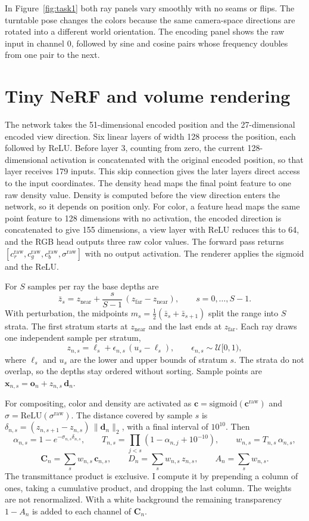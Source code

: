 \documentclass[11pt]{article}
\begin{document}
In Figure~\ref{fig:task1} both ray panels vary smoothly with no seams or flips. The turntable pose changes the colors because the same camera-space directions are rotated into a different world orientation. The encoding panel shows the raw input in channel 0, followed by sine and cosine pairs whose frequency doubles from one pair to the next.

\section{Tiny NeRF and volume rendering}

The network takes the 51-dimensional encoded position and the 27-dimensional encoded view direction. Six linear layers of width 128 process the position, each followed by ReLU. Before layer 3, counting from zero, the current 128-dimensional activation is concatenated with the original encoded position, so that layer receives 179 inputs. This skip connection gives the later layers direct access to the input coordinates. The density head maps the final point feature to one raw density value. Density is computed before the view direction enters the network, so it depends on position only. For color, a feature head maps the same point feature to 128 dimensions with no activation, the encoded direction is concatenated to give 155 dimensions, a view layer with ReLU reduces this to 64, and the RGB head outputs three raw color values. The forward pass returns $[c^{\mathrm{raw}}_r, c^{\mathrm{raw}}_g, c^{\mathrm{raw}}_b, \sigma^{\mathrm{raw}}]$ with no output activation. The renderer applies the sigmoid and the ReLU.

For $S$ samples per ray the base depths are
\[
\bar{z}_s = z_{\mathrm{near}} + \frac{s}{S-1}\,(z_{\mathrm{far}} - z_{\mathrm{near}}), \qquad s = 0, \ldots, S-1.
\]
With perturbation, the midpoints $m_s = \tfrac{1}{2}(\bar{z}_s + \bar{z}_{s+1})$ split the range into $S$ strata. The first stratum starts at $z_{\mathrm{near}}$ and the last ends at $z_{\mathrm{far}}$. Each ray draws one independent sample per stratum,
\[
z_{n,s} = \ell_s + \epsilon_{n,s}\,(u_s - \ell_s), \qquad \epsilon_{n,s} \sim \mathcal{U}[0, 1),
\]
where $\ell_s$ and $u_s$ are the lower and upper bounds of stratum $s$. The strata do not overlap, so the depths stay ordered without sorting. Sample points are $\mathbf{x}_{n,s} = \mathbf{o}_n + z_{n,s}\,\mathbf{d}_n$.

For compositing, color and density are activated as $\mathbf{c} = \mathrm{sigmoid}(\mathbf{c}^{\mathrm{raw}})$ and $\sigma = \mathrm{ReLU}(\sigma^{\mathrm{raw}})$. The distance covered by sample $s$ is $\delta_{n,s} = (z_{n,s+1} - z_{n,s})\,\lVert\mathbf{d}_n\rVert_2$, with a final interval of $10^{10}$. Then
\[
\alpha_{n,s} = 1 - e^{-\sigma_{n,s}\delta_{n,s}}, \qquad
T_{n,s} = \prod_{j<s}\left(1 - \alpha_{n,j} + 10^{-10}\right), \qquad
w_{n,s} = T_{n,s}\,\alpha_{n,s},
\]
\[
\mathbf{C}_n = \sum_s w_{n,s}\,\mathbf{c}_{n,s}, \qquad
D_n = \sum_s w_{n,s}\,z_{n,s}, \qquad
A_n = \sum_s w_{n,s}.
\]
The transmittance product is exclusive. I compute it by prepending a column of ones, taking a cumulative product, and dropping the last column. The weights are not renormalized. With a white background the remaining transparency $1 - A_n$ is added to each channel of $\mathbf{C}_n$.
\end{document}
